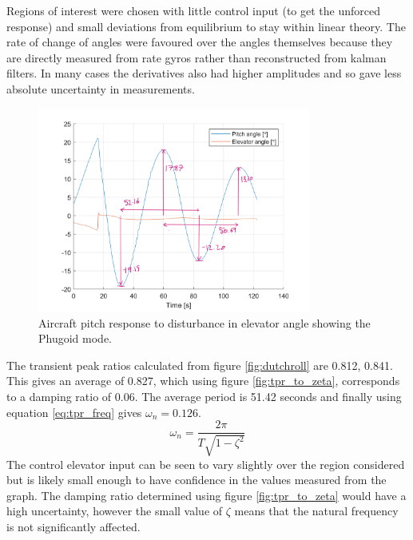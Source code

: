 \documentclass{article}
\begin{document}
Regions of interest were chosen with little control input (to get the unforced response) and small deviations from equilibrium to stay within linear theory.
The rate of change of angles were favoured over the angles themselves because they are directly measured from rate gyros rather than reconstructed from kalman filters.
In many cases the derivatives also had higher amplitudes and so gave less absolute uncertainty in measurements.

\begin{figure}[H]
  \centering
  \includegraphics[width=0.8\textwidth]{figures/anPhugoid.png}
  \caption{Aircraft pitch response to disturbance in elevator angle showing the Phugoid mode.}
  \label{fig:phugoid}
\end{figure}

The transient peak ratios calculated from figure \ref{fig:dutchroll} are 0.812, 0.841.
This gives an average of 0.827, which using figure \ref{fig:tpr_to_zeta}, corresponds to a damping ratio of 0.06.
The average period is 51.42 seconds and finally using equation \ref{eq:tpr_freq} gives $\omega_n = 0.126$.
\begin{equation}
  \omega_n = \frac{2 \pi}{T\sqrt{1 - \zeta^2}}
  \label{eq:tpr_freq}
\end{equation}
The control elevator input can be seen to vary slightly over the region considered but is likely small enough to have confidence in the values measured from the graph.
The damping ratio determined using figure \ref{fig:tpr_to_zeta} would have a high uncertainty, however the small value of $\zeta$ means that the natural frequency is not significantly affected.
\end{document}
